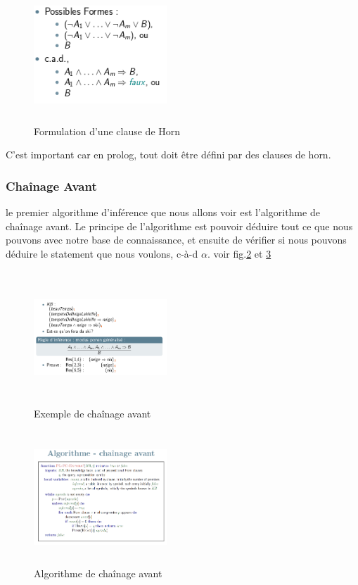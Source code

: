 \documentclass[oneside]{book}
\begin{document}
\begin{figure}[h!t]
\centering
\includegraphics[width = 5cm, height = 5cm, keepaspectratio]{horn.png}
\caption{Formulation d'une clause de Horn}
\label{fig:horn}
\end{figure}

\noindent C'est important car en prolog, tout doit être défini par des clauses de horn.

\subsubsection{Chaînage Avant}
le premier algorithme d'inférence que nous allons voir est l'algorithme de chaînage avant. Le principe de l'algorithme est pouvoir déduire tout ce que nous pouvons avec notre base de connaissance, et ensuite de vérifier si nous pouvons déduire le statement que nous voulons, c-à-d $\alpha$. voir fig.\ref{fig:exemple_chainage avant} et \ref{fig:algo_chainage_avant}

\begin{figure}[h!t]
\centering
\includegraphics[width = 5cm, height = 5cm, keepaspectratio]{chainage_avant_exemple.png}
\caption{Exemple de chaînage avant}
\label{fig:exemple_chainage avant}
\end{figure}

\begin{figure}[h!t]
\centering
\includegraphics[width = 5cm, height = 5cm, keepaspectratio]{algo_chainage_avant.png}
\caption{Algorithme de chaînage avant}
\label{fig:algo_chainage_avant}
\end{figure}
\end{document}
